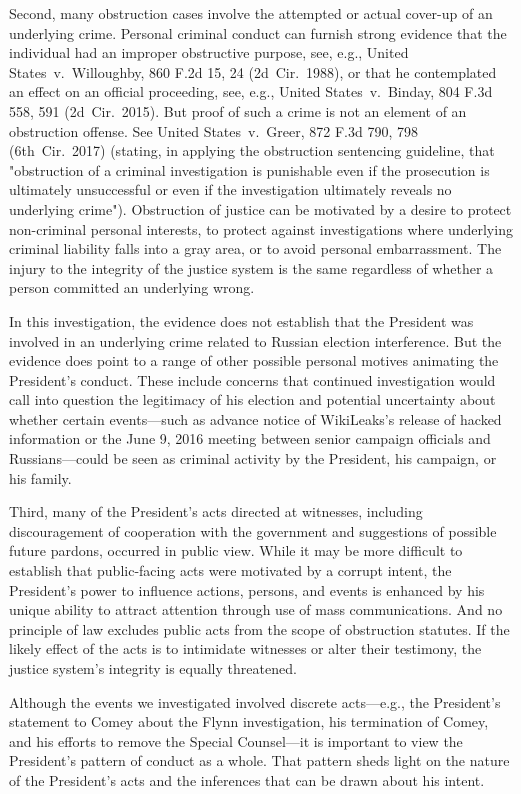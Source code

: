 {Second, many obstruction cases involve the attempted or actual cover-up of an underlying crime.
Personal criminal conduct can furnish strong evidence that the individual had an improper obstructive purpose, see, e.g., United States~v.\ Willoughby, 860 F.2d 15, 24 (2d~Cir.~1988), or that he contemplated an effect on an official proceeding, see, e.g., United States~v.\ Binday, 804 F.3d 558, 591 (2d~Cir.~2015).
But proof of such a crime is not an element of an obstruction offense.
See United States~v.\ Greer, 872 F.3d 790, 798 (6th~Cir.~2017) (stating, in applying the obstruction sentencing guideline, that "obstruction of a criminal investigation is punishable even if the prosecution is ultimately unsuccessful or even if the investigation ultimately reveals no underlying crime").
Obstruction of justice can be motivated by a desire to protect non-criminal personal interests, to protect against investigations where underlying criminal liability falls into a gray area, or to avoid personal embarrassment.
The injury to the integrity of the justice system is the same regardless of whether a person committed an underlying wrong.

In this investigation, the evidence does not establish that the President was involved in an underlying crime related to Russian election interference.
But the evidence does point to a range of other possible personal motives animating the President's conduct.
These include concerns that continued investigation would call into question the legitimacy of his election and potential uncertainty about whether certain events---such as advance notice of WikiLeaks's release of hacked information or the June 9, 2016 meeting between senior campaign officials and Russians---could be seen as criminal activity by the President, his campaign, or his family.

Third, many of the President's acts directed at witnesses, including discouragement of cooperation with the government and suggestions of possible future pardons, occurred in public view.
While it may be more difficult to establish that public-facing acts were motivated by a corrupt intent, the President's power to influence actions, persons, and events is enhanced by his unique ability to attract attention through use of mass communications.
And no principle of law excludes public acts from the scope of obstruction statutes.
If the likely effect of the acts is to intimidate witnesses or alter their testimony, the justice system's integrity is equally threatened.

Although the events we investigated involved discrete acts---e.g., the President's statement to Comey about the Flynn investigation, his termination of Comey, and his efforts to remove the Special Counsel---it is important to view the President's pattern of conduct as a whole.
That pattern sheds light on the nature of the President's acts and the inferences that can be drawn about his intent.

}
